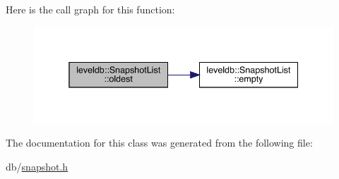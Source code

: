 Here is the call graph for this function\+:
\nopagebreak
\begin{figure}[H]
\begin{center}
\leavevmode
\includegraphics[width=338pt]{classleveldb_1_1_snapshot_list_a2a7757163b6f737771430e3ea1697963_cgraph}
\end{center}
\end{figure}


The documentation for this class was generated from the following file\+:\begin{DoxyCompactItemize}
\item 
db/\mbox{\hyperlink{snapshot_8h}{snapshot.\+h}}\end{DoxyCompactItemize}
